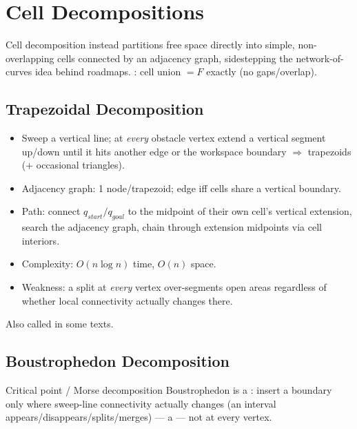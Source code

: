 \section{Cell Decompositions}
Cell decomposition instead partitions free space directly into simple, non-overlapping cells connected by an adjacency graph, sidestepping the network-of-curves idea behind roadmaps. : cell union $=F$ exactly (no gaps/overlap).

\subsection{Trapezoidal Decomposition}
\begin{itemize}
\item Sweep a vertical line; at \emph{every} obstacle vertex extend a vertical segment up/down until it hits another edge or the workspace boundary $\Rightarrow$ trapezoids (+ occasional triangles).
\item Adjacency graph: 1 node/trapezoid; edge iff cells share a vertical boundary.
\item Path: connect $q_{start}/q_{goal}$ to the midpoint of their own cell's vertical extension, search the adjacency graph, chain through extension midpoints via cell interiors.
\item Complexity: $O(n\log n)$ time, $O(n)$ space.
\item Weakness: a split at \emph{every} vertex over-segments open areas regardless of whether local connectivity actually changes there.
\end{itemize}

\begin{notebox}
Also called  in some texts.
\end{notebox}
\begin{democallout}
\end{democallout}

\subsection{Boustrophedon Decomposition}
\begin{defbox}{Critical point / Morse decomposition}
Boustrophedon is a : insert a boundary only where sweep-line connectivity actually changes (an interval appears/disappears/splits/merges) — a  — not at every vertex.
\end{defbox}

